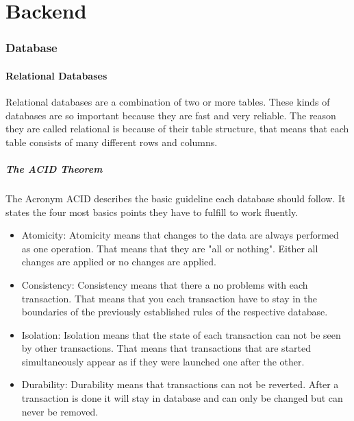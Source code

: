 \part{Backend}
\section{Database}
\subsection{Relational Databases}
    Relational databases are a combination of two or more tables.
    These kinds of databases are so important because they are fast and very reliable. 
    The reason they are called relational is because of their table structure, that means that each table consists of many different rows and columns.
\subsubsection{The ACID Theorem}
The Acronym ACID describes the basic guideline each database should follow. It states the four most basics points they have to fulfill to work fluently.
\begin{itemize}
    \item Atomicity: Atomicity means that changes to the data are always performed as one operation. That means that they are "all or nothing". Either all changes are applied or no changes are applied.
    \item Consistency: Consistency means that there a no problems with each transaction. That means that you each transaction have to stay in the boundaries of the previously established rules of the respective database.
    \item Isolation: Isolation means that the state of each transaction can not be seen by other transactions. That means that transactions that are started simultaneously appear as if they were launched one after the other.
    \item Durability: Durability means that transactions can not be reverted. After a transaction is done it will stay in database and can only be changed but can never be removed.
\end{itemize}
